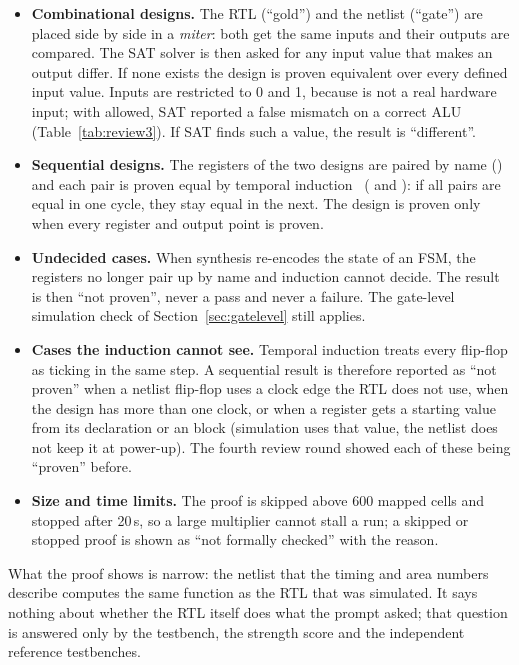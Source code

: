 \begin{itemize}
\item \textbf{Combinational designs.} The RTL (``gold'') and the netlist (``gate'')
are placed side by side in a \emph{miter}: both get the same inputs and their outputs
are compared. The SAT solver is then asked for any input value that makes an output
differ. If none exists the design is proven equivalent over every defined input
value. Inputs are restricted to 0 and 1, because  is not a real hardware
input; with  allowed, SAT reported a false mismatch on a correct ALU
(Table~\ref{tab:review3}). If SAT finds such a value, the result is ``different''.
\item \textbf{Sequential designs.} The registers of the two designs are paired by
name () and each pair is proven equal by temporal
induction~\cite{sheeran} ( and ): if all
pairs are equal in one cycle, they stay equal in the next. The design is proven only
when every register and output point is proven.
\item \textbf{Undecided cases.} When synthesis re-encodes the state of an FSM, the
registers no longer pair up by name and induction cannot decide. The result is then
``not proven'', never a pass and never a failure. The gate-level simulation check
of Section~\ref{sec:gatelevel} still applies.
\item \textbf{Cases the induction cannot see.} Temporal induction treats every
flip-flop as ticking in the same step. A sequential result is therefore reported as
``not proven'' when a netlist flip-flop uses a clock edge the RTL does not use, when
the design has more than one clock, or when a register gets a starting value from its
declaration or an  block (simulation uses that value, the netlist does
not keep it at power-up). The fourth review round showed each of these being
``proven'' before.
\item \textbf{Size and time limits.} The proof is skipped above 600 mapped cells and
stopped after 20\,s, so a large multiplier cannot stall a run; a skipped or stopped
proof is shown as ``not formally checked'' with the reason.
\end{itemize}

What the proof shows is narrow: the netlist that the timing and area numbers describe
computes the same function as the RTL that was simulated. It says nothing about
whether the RTL itself does what the prompt asked; that question is answered only by
the testbench, the strength score and the independent reference testbenches.

